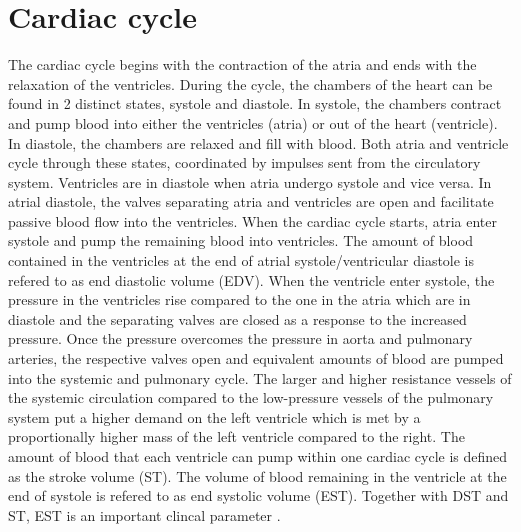 \section{Cardiac cycle}
The cardiac cycle begins with the contraction of the atria and ends with the relaxation of the ventricles. During the cycle, the chambers of the heart can be found in \num{2} distinct states, systole and diastole. In systole, the chambers contract and pump blood into either the ventricles (atria) or out of the heart (ventricle). In diastole, the chambers are relaxed and fill with blood. Both atria and ventricle cycle through these states, coordinated by impulses sent from the circulatory system.  Ventricles are in diastole when atria undergo systole and vice versa. In atrial diastole, the valves separating atria and ventricles are open and facilitate passive blood flow into the ventricles. When the cardiac cycle starts, atria enter systole and pump the remaining blood into ventricles.  The amount of blood contained in the ventricles at the end of atrial systole/ventricular diastole is refered to as end diastolic volume (EDV). When the ventricle enter systole, the pressure in the ventricles rise compared to the one in the atria which are in diastole and the separating valves are closed as a response to the increased pressure. Once the pressure overcomes the pressure in aorta and pulmonary arteries, the respective valves open and equivalent amounts of blood are pumped into the systemic and pulmonary cycle. The larger and higher resistance vessels of the systemic circulation compared to the low-pressure vessels of the pulmonary system put a higher demand on the left ventricle which is met by a proportionally higher mass of the left ventricle compared to the right. The amount of blood that each ventricle can pump within one cardiac cycle is defined as the stroke volume (ST). The volume of blood remaining in the ventricle at the end of systole is refered to as end systolic volume (EST). Together with DST and ST, EST is an important clincal parameter \citep{Betts2013}. 

